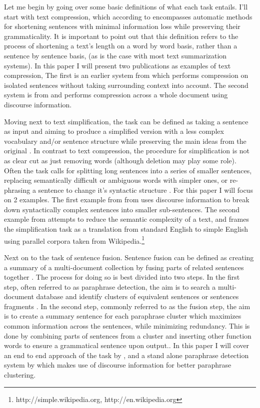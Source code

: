 {Let me begin by going over some basic definitions of what each task entails.  I'll start with text compression, which according to \citet{Clarke:2010:DCD:1950488.1950493} encompasses automatic methods for shortening sentences with minimal information loss while preserving their grammaticality.  It is important to point out that this definition refers to the process of shortening a text's length on a word by word basis, rather than a sentence by sentence basis, (as is the case with most text summarization systems). In this paper I will present two publications as examples of text compression,  The first is an earlier system from \citet{galley2007lexicalized} which performs compression on isolated sentences without taking surrounding context into account.  The second system is from \citet{Clarke:2010:DCD:1950488.1950493} and performs compression across a whole document using discourse information.  

{Moving next to text simplification, the task can be defined as taking a sentence as input and aiming to produce a simplified version with a less complex vocabulary and/or sentence structure while preserving the main ideas from the original \citep{Feng2008}.  In contrast to text compression, the procedure for simplification is not as clear cut as just removing words (although deletion may play some role). Often the task calls for splitting long sentences into a series of smaller sentences, replacing semantically difficult or ambiguous words with simpler ones, or re-phrasing a sentence to change it's syntactic structure \citep{coster-kauchak:2011:T2TW-2011}.  For this paper I will focus on 2 examples. The first example from from \citet{Siddharthan2006} uses discourse information to break down syntactically complex sentences into smaller sub-sentences.  The second example from \citet{coster-kauchak:2011:T2TW-2011} attempts to reduce the semantic complexity of a text, and frames the simplification task as a translation from standard English to simple English using parallel corpora taken from Wikipedia.\footnote{http://simple.wikipedia.org,	http://en.wikipedia.org}}
 
{Next on to the task of sentence fusion.  Sentence fusion can be defined as creating a summary of a multi-document collection by fusing parts of related sentences together \citep{Filippova:2008:SFV:1613715.1613741}.   The process for doing so is best divided into two steps.  In the first step, often referred to as paraphrase detection, the aim is to search a multi-document database  and identify clusters of equivalent sentences or sentences fragments \citep{Regneri:2012:UDI:2390948.2391048}. In the second step, commonly referred to as the fusion step,  the aim is to create a summary sentence for each paraphrase cluster which maximizes common information across the sentences, while minimizing redundancy.  This is done by combining parts of sentences from a cluster and inserting other function words to ensure a grammatical sentence upon output.\citep{Filippova:2008:SFV:1613715.1613741}. In this paper I will cover an end to end approach of the task by \citet{Filippova:2008:SFV:1613715.1613741}, and a stand alone paraphrase detection system by \citet{Regneri:2012:UDI:2390948.2391048} which makes use of discourse information for better paraphrase clustering.}

}
